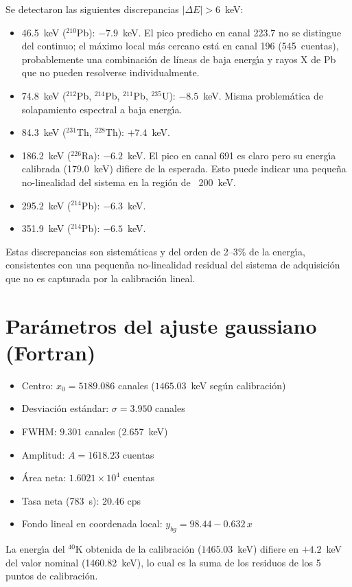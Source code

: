 \documentclass[12pt,a4paper]{article}
\begin{document}
\noindent Se detectaron las siguientes discrepancias $|\Delta E| > 6$~keV:
\begin{itemize}
  \item 46.5~keV ($^{210}$Pb): $-7.9$~keV. El pico predicho en canal 223.7
    no se distingue del continuo; el m\'aximo local m\'as cercano est\'a en
    canal 196 (545~cuentas), probablemente una combinaci\'on de l\'ineas de
    baja energ\'{\i}a y rayos X de Pb que no pueden resolverse
    individualmente.
  \item 74.8~keV ($^{212}$Pb, $^{214}$Pb, $^{211}$Pb, $^{235}$U): $-8.5$~keV.
    Misma problem\'atica de solapamiento espectral a baja energ\'{\i}a.
  \item 84.3~keV ($^{231}$Th, $^{228}$Th): $+7.4$~keV.
  \item 186.2~keV ($^{226}$Ra): $-6.2$~keV. El pico en canal 691 es claro
    pero su energ\'{\i}a calibrada (179.0~keV) difiere de la esperada.
    Esto puede indicar una peque\~na no-linealidad del sistema en la regi\'on
    de ~200~keV.
  \item 295.2~keV ($^{214}$Pb): $-6.3$~keV.
  \item 351.9~keV ($^{214}$Pb): $-6.5$~keV.
\end{itemize}
Estas discrepancias son sistem\'aticas y del orden de 2--3\% de la energ\'{\i}a,
consistentes con una pequen\~na no-linealidad residual del sistema de
adquisici\'on que no es capturada por la calibraci\'on lineal.

\section*{Par\'ametros del ajuste gaussiano (Fortran)}
\begin{itemize}
  \item Centro: $x_0 = 5189.086$ canales ($1465.03$~keV seg\'un calibraci\'on)
  \item Desviaci\'on est\'andar: $\sigma = 3.950$ canales
  \item FWHM: $9.301$ canales ($2.657$~keV)
  \item Amplitud: $A = 1618.23$ cuentas
  \item \'Area neta: $1.6021 \times 10^4$ cuentas
  \item Tasa neta (783~s): $20.46$ cps
  \item Fondo lineal en coordenada local: $y_{bg}=98.44 - 0.632\,x$
\end{itemize}
La energ\'{\i}a del $^{40}$K obtenida de la calibraci\'on
($1465.03$~keV) difiere en $+4.2$~keV del valor nominal (1460.82~keV),
lo cual es la suma de los residuos de los 5 puntos de calibraci\'on.
\end{document}
